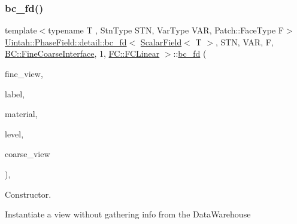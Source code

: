 \subsubsection{\texorpdfstring{bc\+\_\+fd()}{bc\_fd()}\hspace{0.1cm}{\footnotesize\ttfamily [2/3]}}
{\footnotesize\ttfamily template$<$typename T , Stn\+Type S\+TN, Var\+Type V\+AR, Patch\+::\+Face\+Type F$>$ \\
\hyperlink{classUintah_1_1PhaseField_1_1detail_1_1bc__fd}{Uintah\+::\+Phase\+Field\+::detail\+::bc\+\_\+fd}$<$ \hyperlink{structUintah_1_1PhaseField_1_1ScalarField}{Scalar\+Field}$<$ T $>$, S\+TN, V\+AR, F, \hyperlink{namespaceUintah_1_1PhaseField_a148fba372aa3be96fd6eede7a2fa10b5ad2d89be9637ff8b537fa4b6026c0e574}{B\+C\+::\+Fine\+Coarse\+Interface}, 1, \hyperlink{namespaceUintah_1_1PhaseField_aeb51fe956fe07f1487f5878f4039f27ca7460527a4d3065117218d8822530ed6a}{F\+C\+::\+F\+C\+Linear} $>$\+::\hyperlink{classUintah_1_1PhaseField_1_1detail_1_1bc__fd}{bc\+\_\+fd} (\begin{DoxyParamCaption}\item[{const \hyperlink{classUintah_1_1PhaseField_1_1detail_1_1view}{view}$<$ \hyperlink{structUintah_1_1PhaseField_1_1ScalarField}{Field} $>$ $\ast$}]{fine\+\_\+view,  }\item[{const Var\+Label $\ast$}]{label,  }\item[{int}]{material,  }\item[{const Level $\ast$}]{level,  }\item[{\hyperlink{classUintah_1_1PhaseField_1_1detail_1_1view}{view}$<$ \hyperlink{structUintah_1_1PhaseField_1_1ScalarField}{Field} $>$ $\ast$}]{coarse\+\_\+view }\end{DoxyParamCaption})\hspace{0.3cm}{\ttfamily [inline]}, {\ttfamily [protected]}}



Constructor. 

Instantiate a view without gathering info from the Data\+Warehouse


